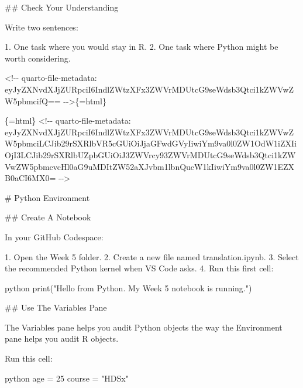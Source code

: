 \documentclass[
  letterpaper,
  DIV=11,
  numbers=noendperiod,
  oneside]{scrreprt}
\newenvironment{Shaded}{\begin{snugshade}}{\end{snugshade}}
\newcommand{\BuiltInTok}[1]{\textcolor[rgb]{0.00,0.23,0.31}{#1}}
\newcommand{\DecValTok}[1]{\textcolor[rgb]{0.68,0.00,0.00}{#1}}
\newcommand{\FunctionTok}[1]{\textcolor[rgb]{0.28,0.35,0.67}{#1}}
\newcommand{\InformationTok}[1]{\textcolor[rgb]{0.37,0.37,0.37}{#1}}
\newcommand{\NormalTok}[1]{\textcolor[rgb]{0.00,0.23,0.31}{#1}}
\newcommand{\OperatorTok}[1]{\textcolor[rgb]{0.37,0.37,0.37}{#1}}
\newcommand{\SpecialStringTok}[1]{\textcolor[rgb]{0.13,0.47,0.30}{#1}}
\newcommand{\StringTok}[1]{\textcolor[rgb]{0.13,0.47,0.30}{#1}}
\begin{document}
\begin{Shaded}
\begin{Highlighting}[numbers=left,,]
\FunctionTok{\#\# Check Your Understanding}

\NormalTok{Write two sentences:}

\SpecialStringTok{1. }\NormalTok{One task where you would stay in R.}
\SpecialStringTok{2. }\NormalTok{One task where Python might be worth considering.}


\InformationTok{\textasciigrave{}\textless{}!{-}{-} quarto{-}file{-}metadata: eyJyZXNvdXJjZURpciI6IndlZWtzXFx3ZWVrMDUtcG9seWdsb3Qtci1kZWVwZW5pbmcifQ== {-}{-}\textgreater{}\textasciigrave{}}\NormalTok{\{=html\}}

\InformationTok{\textasciigrave{}\textasciigrave{}\textasciigrave{}\{=html\}}
\InformationTok{\textless{}!{-}{-} quarto{-}file{-}metadata: eyJyZXNvdXJjZURpciI6IndlZWtzXFx3ZWVrMDUtcG9seWdsb3Qtci1kZWVwZW5pbmciLCJib29rSXRlbVR5cGUiOiJjaGFwdGVyIiwiYm9va0l0ZW1OdW1iZXIiOjI3LCJib29rSXRlbUZpbGUiOiJ3ZWVrcy93ZWVrMDUtcG9seWdsb3Qtci1kZWVwZW5pbmcvcHl0aG9uMDItZW52aXJvbm1lbnQucW1kIiwiYm9va0l0ZW1EZXB0aCI6MX0= {-}{-}\textgreater{}}
\InformationTok{\textasciigrave{}\textasciigrave{}\textasciigrave{}}

\FunctionTok{\# Python Environment }


\FunctionTok{\#\# Create A Notebook}

\NormalTok{In your GitHub Codespace:}

\SpecialStringTok{1. }\NormalTok{Open the Week 5 folder.}
\SpecialStringTok{2. }\NormalTok{Create a new file named }\InformationTok{\textasciigrave{}translation.ipynb\textasciigrave{}}\NormalTok{.}
\SpecialStringTok{3. }\NormalTok{Select the recommended Python kernel when VS Code asks.}
\SpecialStringTok{4. }\NormalTok{Run this first cell:}

\InformationTok{\textasciigrave{}\textasciigrave{}\textasciigrave{}python}
\BuiltInTok{print}\NormalTok{(}\StringTok{"Hello from Python. My Week 5 notebook is running."}\NormalTok{)}
\InformationTok{\textasciigrave{}\textasciigrave{}\textasciigrave{}}

\FunctionTok{\#\# Use The Variables Pane}

\NormalTok{The Variables pane helps you audit Python objects the way the Environment pane helps you audit R objects.}

\NormalTok{Run this cell:}

\InformationTok{\textasciigrave{}\textasciigrave{}\textasciigrave{}python}
\NormalTok{age }\OperatorTok{=} \DecValTok{25}
\NormalTok{course }\OperatorTok{=} \StringTok{"HDSx"}
\InformationTok{\textasciigrave{}\textasciigrave{}\textasciigrave{}}


\end{Highlighting}
\end{Shaded}
\end{document}
